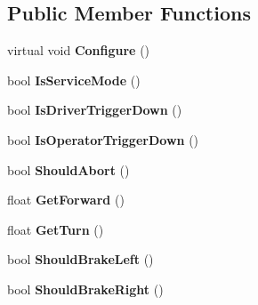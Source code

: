 \subsection*{\-Public \-Member \-Functions}
\begin{DoxyCompactItemize}
\item 
\hypertarget{class_processed_inputs_a1f0152816b139c97d150c103208202b5}{
virtual void {\bfseries \-Configure} ()}
\label{class_processed_inputs_a1f0152816b139c97d150c103208202b5}

\item 
\hypertarget{class_processed_inputs_ae0d0d9579ff79d56b5bb157f188fb2fe}{
bool {\bfseries \-Is\-Service\-Mode} ()}
\label{class_processed_inputs_ae0d0d9579ff79d56b5bb157f188fb2fe}

\item 
\hypertarget{class_processed_inputs_a34a3925e933c33cd4bdc912c94f5ba70}{
bool {\bfseries \-Is\-Driver\-Trigger\-Down} ()}
\label{class_processed_inputs_a34a3925e933c33cd4bdc912c94f5ba70}

\item 
\hypertarget{class_processed_inputs_a21f76b4bdf5b023343e410833a732a76}{
bool {\bfseries \-Is\-Operator\-Trigger\-Down} ()}
\label{class_processed_inputs_a21f76b4bdf5b023343e410833a732a76}

\item 
\hypertarget{class_processed_inputs_a0791fdd4de93770eac8cf5e49bef3ef0}{
bool {\bfseries \-Should\-Abort} ()}
\label{class_processed_inputs_a0791fdd4de93770eac8cf5e49bef3ef0}

\item 
\hypertarget{class_processed_inputs_a582f9b5b7ffdef07f779a59cf4f87ea8}{
float {\bfseries \-Get\-Forward} ()}
\label{class_processed_inputs_a582f9b5b7ffdef07f779a59cf4f87ea8}

\item 
\hypertarget{class_processed_inputs_aebbffcdcb6a01b4e61543f2e1c97ea17}{
float {\bfseries \-Get\-Turn} ()}
\label{class_processed_inputs_aebbffcdcb6a01b4e61543f2e1c97ea17}

\item 
\hypertarget{class_processed_inputs_a413dff24b8852f2de0cad48d53081119}{
bool {\bfseries \-Should\-Brake\-Left} ()}
\label{class_processed_inputs_a413dff24b8852f2de0cad48d53081119}

\item 
\hypertarget{class_processed_inputs_a2bf2a39e1b3c5d4e36d5f9c17a74014e}{
bool {\bfseries \-Should\-Brake\-Right} ()}
\label{class_processed_inputs_a2bf2a39e1b3c5d4e36d5f9c17a74014e}


\end{DoxyCompactItemize}
